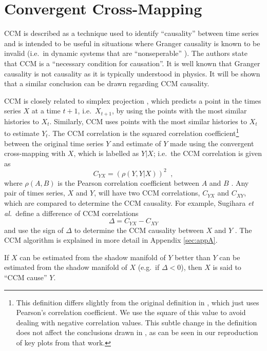 \documentclass[a4paper,11pt]{article}
\begin{document}
\section{Convergent Cross-Mapping}
CCM is described as a technique used to identify ``causality'' between time series and is intended to be useful in situations where Granger causality is known to be invalid (i.e.\ in dynamic systems that are ``nonseperable'' \cite{Sugihara2012}).  The authors state that CCM is a ``necessary condition for causation''.  It is well known \cite{Granger1980,liu2012,Roberts1985} that Granger causality is not causality as it is typically understood in physics.  It will be shown that a similar conclusion can be drawn regarding CCM causality. 

CCM is closely related to simplex projection \cite{Sugihara1990,Sugihara1990a}, which predicts a point in the times series $X$ at a time $t+1$, i.e.\ $X_{t+1}$, by using the points with the most similar histories to $X_t$.  Similarly, CCM uses points with the most similar histories to $X_t$ to estimate $Y_t$.  The CCM correlation is the squared correlation coefficient\footnote{This definition differs slightly from the original definition in \cite{Sugihara2012}, which just uses Pearson’s correlation coefficient.  We use the square of this value to avoid dealing with negative correlation values.  This subtle change in the definition does not affect the conclusions drawn in \cite{Sugihara2012}, as can be seen in our reproduction of key plots from that work.} between the original time series $Y$ and estimate of $Y$ made using the convergent cross-mapping with $X$, which is labelled as $Y|X$; i.e.\ the CCM correlation is given as 
$$
C_{YX} = \left(\rho\left(Y,Y|X\right)\right)^2\;\;,
$$
where $\rho(A,B)$ is the Pearson correlation coefficient between $A$ and $B$ \cite{}.  Any pair of times series, $X$ and $Y$, will have two CCM correlations, $C_{YX}$ and $C_{XY}$, which are compared to determine the CCM causality.  For example, Sugihara {\em et al.\ }define a difference of CCM correlations
\begin{equation}
\label{eqn:delta}
\Delta = C_{YX} - C_{XY}
\end{equation}
and use the sign of $\Delta$ to determine the CCM causality between $X$ and $Y$ \cite{Sugihara2012}.  The CCM algorithm is explained in more detail in Appendix \ref{sec:appA}.

If $X$ can be estimated from the shadow manifold of $Y$ better than $Y$ can be estimated from the shadow manifold of $X$ (e.g.\ if $\Delta < 0$), then $X$ is said to ``CCM cause'' $Y$.
\end{document}
